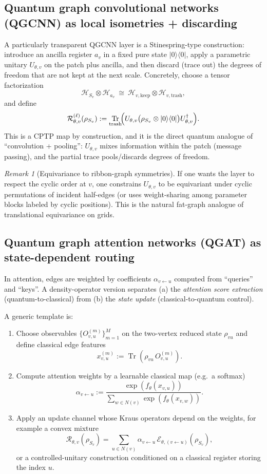 \documentclass[11pt,oneside]{amsbook}
\numberwithin{equation}{section}
\theoremstyle{plain}
\theoremstyle{definition}
\theoremstyle{remark}
\newtheorem{remark}[theorem]{Remark}
\DeclareMathOperator{\Tr}{\mathrm{Tr}}
\newcommand{\ket}[1]{\lvert #1 \rangle}
\newcommand{\bra}[1]{\langle #1 \rvert}
\begin{document}
\subsection{Quantum graph convolutional networks (QGCNN) as local isometries + discarding}
A particularly transparent QGCNN layer is a Stinespring-type construction:
introduce an ancilla register $a_v$ in a fixed pure state $\ket{0}\bra{0}$, apply a parametric unitary $U_{\theta,v}$ on the patch plus ancilla, and then discard (trace out) the degrees of freedom that are not kept at the next scale.
Concretely, choose a tensor factorization
\[
\mathcal{H}_{S_v}\otimes \mathcal{H}_{a_v}\ \cong\ \mathcal{H}_{v,\mathrm{keep}}\otimes \mathcal{H}_{v,\mathrm{trash}},
\]
and define
\begin{equation}
\label{eq:qgcnn_layer}
\mathcal{R}_{\theta,v}^{(\ell)}(\rho_{S_v})
:=
\Tr_{\mathrm{trash}}\!\Bigl(
U_{\theta,v}\bigl(\rho_{S_v}\otimes \ket{0}\bra{0}\bigr)U_{\theta,v}^\dagger
\Bigr).
\end{equation}
This is a CPTP map by construction, and it is the direct quantum analogue of ``convolution + pooling'':
$U_{\theta,v}$ mixes information within the patch (message passing), and the partial trace pools/discards degrees of freedom.

\begin{remark}[Equivariance to ribbon-graph symmetries]
If one wants the layer to respect the cyclic order at $v$, one constrains $U_{\theta,v}$ to be equivariant under cyclic permutations of incident half-edges (or uses weight-sharing among parameter blocks labeled by cyclic positions).
This is the natural fat-graph analogue of translational equivariance on grids.
\end{remark}

\subsection{Quantum graph attention networks (QGAT) as state-dependent routing}
In attention, edges are weighted by coefficients $\alpha_{v\leftarrow u}$ computed from ``queries'' and ``keys''.
A density-operator version separates (a) the \emph{attention score extraction} (quantum-to-classical) from (b) the \emph{state update} (classical-to-quantum control).

A generic template is:
\begin{enumerate}
\item Choose observables $\{O_{v,u}^{(m)}\}_{m=1}^M$ on the two-vertex reduced state $\rho_{vu}$ and define classical edge features
\[
x_{v,u}^{(m)}:=\Tr(\rho_{vu}\,O_{v,u}^{(m)}).
\]
\item Compute attention weights by a learnable classical map (e.g.\ a softmax)
\[
\alpha_{v\leftarrow u}:=\frac{\exp(f_\theta(x_{v,u}))}{\sum_{w\in N(v)}\exp(f_\theta(x_{v,w}))}.
\]
\item Apply an update channel whose Kraus operators depend on the weights, for example a convex mixture
\[
\mathcal{R}_{\theta,v}(\rho_{S_v})
=\sum_{u\in N(v)} \alpha_{v\leftarrow u}\,\mathcal{E}_{\theta,(v\leftarrow u)}(\rho_{S_v}),
\]
or a controlled-unitary construction conditioned on a classical register storing the index $u$.
\end{enumerate}
\end{document}
